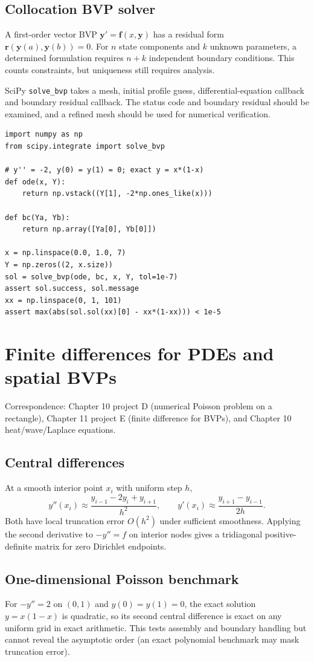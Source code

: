 \documentclass[11pt,letterpaper,oneside]{report}
\theoremstyle{definition}\newtheorem{definition}[theorem]{Definition}
\theoremstyle{remark}\newtheorem{remark}[theorem]{Remark}
\begin{document}
\section{Collocation BVP solver}
A first-order vector BVP $\mathbf y'=\mathbf f(x,\mathbf y)$ has a residual form $\mathbf r(\mathbf y(a),\mathbf y(b))=0$. For $n$ state components and $k$ unknown parameters, a determined formulation requires $n+k$ independent boundary conditions. This counts constraints, but uniqueness still requires analysis.
\begin{modern}SciPy \texttt{solve\_bvp} takes a mesh, initial profile guess, differential-equation callback and boundary residual callback. The status code and boundary residual should be examined, and a refined mesh should be used for numerical verification.\end{modern}
\begin{lstlisting}
import numpy as np
from scipy.integrate import solve_bvp

# y'' = -2, y(0) = y(1) = 0; exact y = x*(1-x)
def ode(x, Y):
    return np.vstack((Y[1], -2*np.ones_like(x)))

def bc(Ya, Yb):
    return np.array([Ya[0], Yb[0]])

x = np.linspace(0.0, 1.0, 7)
Y = np.zeros((2, x.size))
sol = solve_bvp(ode, bc, x, Y, tol=1e-7)
assert sol.success, sol.message
xx = np.linspace(0, 1, 101)
assert max(abs(sol.sol(xx)[0] - xx*(1-xx))) < 1e-5
\end{lstlisting}
\chapter{Finite differences for PDEs and spatial BVPs}
\begin{bookground}Correspondence: Chapter 10 project D (numerical Poisson problem on a rectangle), Chapter 11 project E (finite difference for BVPs), and Chapter 10 heat/wave/Laplace equations.\end{bookground}
\section{Central differences}
At a smooth interior point $x_i$ with uniform step $h$,
\[y''(x_i)\approx\frac{y_{i-1}-2y_i+y_{i+1}}{h^2},\qquad y'(x_i)\approx\frac{y_{i+1}-y_{i-1}}{2h}.\]
Both have local truncation error $O(h^2)$ under sufficient smoothness. Applying the second derivative to $-y''=f$ on interior nodes gives a tridiagonal positive-definite matrix for zero Dirichlet endpoints.
\section{One-dimensional Poisson benchmark}
For $-y''=2$ on $(0,1)$ and $y(0)=y(1)=0$, the exact solution $y=x(1-x)$ is quadratic, so its second central difference is exact on any uniform grid in exact arithmetic. This tests assembly and boundary handling but cannot reveal the asymptotic order (an exact polynomial benchmark may mask truncation error).
\end{document}
